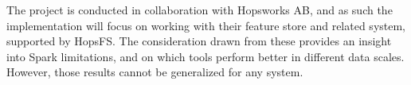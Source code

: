 The project is conducted in collaboration with Hopsworks AB, and as such the implementation will focus on working with their feature store and related system, supported by \gls{HopsFS}. The consideration drawn from these provides an insight into Spark limitations, and on which tools perform better in different data scales. However, those results cannot be generalized for any system.
